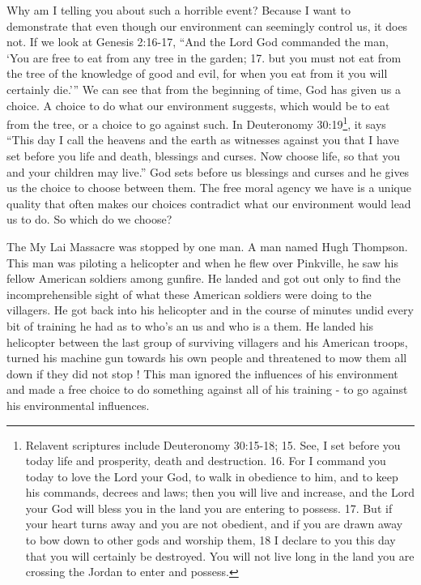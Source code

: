 \documentclass[11pt]{article}
\begin{document}
\begin{multicols}{2}
Why am I telling you about such a horrible event? Because I want to demonstrate that even though our environment can seemingly control us, it does not. If we look at Genesis 2:16-17, ``And the Lord God commanded the man, `You are free to eat from any tree in the garden; 17. but you must not eat from the tree of the knowledge of good and evil, for when you eat from it you will certainly die.''' We can see that from the beginning of time, God has given us a choice. A choice to do what our environment suggests, which would be to eat from the tree, or a choice to go against such. In Deuteronomy 30:19\footnote{Relavent scriptures include Deuteronomy 30:15-18;	15. See, I set before you today life and prosperity, death and destruction. 16. For I command you today to love the Lord your God, to walk in obedience to him, and to keep his commands, decrees and laws; then you will live and increase, and the Lord your God will bless you in the land you are entering to possess. 17. But if your heart turns away and you are not obedient, and if you are drawn away to bow down to other gods and worship them, 18 I declare to you this day that you will certainly be destroyed. You will not live long in the land you are crossing the Jordan to enter and possess.}, it says ``This day I call the heavens and the earth as witnesses against you that I have set before you life and death, blessings and curses. Now choose life, so that you and your children may live.'' God sets before us blessings and curses and he gives us the choice to choose between them. The free moral agency we have is a unique quality that often makes our choices contradict what our environment would lead us to do. So which do we choose?

The My Lai Massacre was stopped by one man. A man named Hugh Thompson. This man was piloting a helicopter and when he flew over Pinkville, he saw his fellow American soldiers among gunfire. He landed and got out only to find the incomprehensible sight of what these American soldiers were doing to the villagers. He got back into his helicopter and in the course of minutes undid every bit of training he had as to who's an us and who is a them. He landed his helicopter between the last group of surviving villagers and his American troops, turned his machine gun towards his own people and threatened to mow them all down if they did not stop \cite{Robert Sapolsky}! This man ignored the influences of his environment and made a free choice to do something against all of his training - to go against his environmental influences.


\end{multicols}
\end{document}
